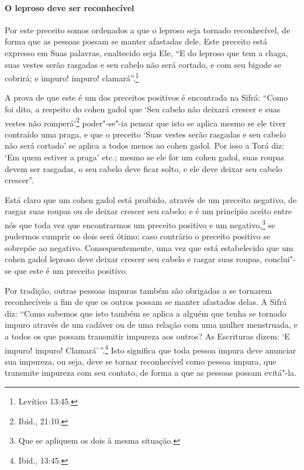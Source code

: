 \begin{multicols}{2}
\paragraph{O leproso deve ser reconhecível}

Por este preceito somos ordenados a que o leproso seja tornado
reconhecível, de forma que as pessoas possam se manter afastadas dele.
Este preceito está expresso em Suas palavras, enaltecido seja Ele, ``E
do leproso que tem a chaga, suas vestes serão rasgadas e seu cabelo não
será cortado, e com seu bigode se cobrirá; e impuro! impuro! clamará''.\footnote{Levítico 13:45.}

A prova de que este é um dos preceitos positivos é encontrada na Sifrá\starr:
``Como foi dito, a respeito do cohen gadol\starr{} que `Seu cabelo não deixará
crescer e suas vestes não romperá'\footnote{Ibid., 21:10.} poder"-se"-ia pensar que
isto se aplica mesmo se ele tiver contraído uma praga, e que o preceito
`Suas vestes serão rasgadas e seu cabelo não será cortado' se aplica a
todos menos ao cohen gadol\starr. Por isso a Torá\starr{} diz: `Em quem estiver a
praga' etc.; mesmo se ele for um cohen gadol\starr, suas roupas devem ser
rasgadas, o seu cabelo deve ficar solto, e ele deve deixar seu cabelo
crescer''.

Está claro que um cohen gadol\starr{} está proibido, através de um preceito negativo, de rasgar suas roupas ou de deixar crescer seu cabelo; e
é um princípio aceito entre nós que toda vez que encontrarmos um
preceito positivo e um negativo,\footnote{Que se apliquem os dois à mesma situação.} se pudermos
cumprir os dois será ótimo; caso contrário o preceito positivo se
sobrepõe ao negativo. Consequentemente, uma vez que está estabelecido
que um cohen gadol\starr{} leproso deve deixar crescer seu cabelo e rasgar
suas roupas, conclui"-se que este é um preceito positivo.

Por tradição, outras pessoas impuras também são obrigadas a se tornarem
reconhecíveis a fim de que os outros possam se manter afastados delas. A
Sifrá\starr{} diz: ``Como sabemos que isto também se aplica a alguém que tenha
se tornado impuro através de um cadáver ou de uma relação com uma
mulher menstruada, e a todos os que possam transmitir impureza aos
outros? As Escrituras dizem: `E impuro! impuro! Clamará'\,''.\footnote{Ibid.,
13:45.} Isto significa que toda pessoa impura deve anunciar sua
impureza, ou seja, deve se tornar reconhecível como pessoa impura, que
transmite impureza com seu contato, de forma a que as pessoas possam
evitá"-la.


\end{multicols}

